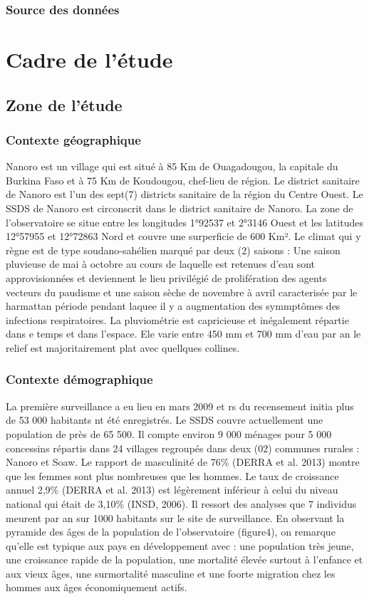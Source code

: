\documentclass[12pt,a4paper]{report}
\begin{document}
			\subsection{Source des données}
			
			
			
	\chapter{Cadre de l'étude}	
		\section{Zone de l'étude}
			\subsection{Contexte géographique}
			
			Nanoro est un village qui est situé à 85 Km de Ouagadougou, la capitale du Burkina Faso et à 75 Km de Koudougou, chef-lieu de région. Le district sanitaire de Nanoro est l'un des sept(7) districts sanitaire de la région du Centre Ouest. Le SSDS de Nanoro est circonscrit dans le district sanitaire de Nanoro. La zone de l'observatoire se situe entre les longitudes 1°92537 et 2°3146 Ouest et les latitudes 12°57955 et 12°72863 Nord et couvre une surperficie de 600 Km². Le climat qui y règne est de type soudano-sahélien marqué par deux (2) saisons : Une saison pluvieuse de mai à octobre au cours de laquelle est retenues d'eau sont approvisionnées et deviennent le lieu privilégié de prolifération des agents vecteurs du paudisme et une saison sèche de novembre à avril caracterisée par le harmattan période pendant laquee il y a augmentation des symmptômes des infections respiratoires. La pluviométrie est capricieuse et inégalement répartie dans e temps et dans l'espace. Ele varie entre 450 mm et 700 mm d'eau par an le relief est majoritairement plat avec quellques collines.
			
			\subsection{Contexte démographique}
			
			La première surveillance a eu lieu en mars 2009 et rs du recensement initia plus de 53 000 habitants nt été enregistrés. Le SSDS couvre actuellement une population de près de 65 500. Il compte environ 9 000 ménages pour 5 000 concessins répartis dans 24 villages regroupés dans deux (02) communes rurales : Nanoro et Soaw. Le rapport de masculinité de 76\% (DERRA et al. 2013) montre que les femmes sont plus nombreuses que les hommes. Le taux de croissance annuel 2,9\% (DERRA et al. 2013) est légèrement inférieur à celui du niveau national qui était de 3,10\% (INSD, 2006). Il ressort des analyses que 7 individus meurent par an sur 1000 habitants sur le site de surveillance. En observant la pyramide des âges de la population de l'observatoire (figure4), on remarque qu'elle est typique aux pays en développement avec : une population très jeune, une croissance rapide de la population, une mortalité élevée surtout à l'enfance et aux vieux âges, une surmortalité masculine et une foorte migration chez les hommes aux âges économiquement actifs.
			
\end{document}
